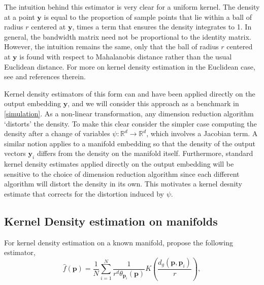 \documentclass[11pt,a4paper,]{article}
\begin{document}
The intuition behind this estimator is very clear for a uniform kernel. The density at a point \(\pmb{y}\) is equal to the proportion of sample points that lie within a ball of radius \(r\) centered at \(\pmb{y}\), times a term that ensures the density integrates to 1. In general, the bandwidth matrix need not be proportional to the identity matrix. However, the intuition remains the same, only that the ball of radius \(r\) centered at \(\pmb{y}\) is found with respect to Mahalanobis distance rather than the usual Euclidean distance. For more on kernel density estimation in the Euclidean case, see \textcite{Scott2015-vl} and references therein.

Kernel density estimators of this form can and have been applied directly on the output embedding \(\pmb{y}\), and we will consider this approach as a benchmark in \autoref{simulation}. As a non-linear transformation, any dimension reduction algorithm `distorts' the density. To make this clear consider the simpler case computing the density after a change of variables \(\psi:\mathbb{R}^d\rightarrow\mathbb{R}^d\), which involves a Jacobian term. A similar notion applies to a manifold embedding so that the density of the output vectors \(\pmb{y}_i\) differs from the density on the manifold itself. Furthermore, standard kernel density estimates applied directly on the output embedding will be sensitive to the choice of dimension reduction algorithm since each different algorithm will distort the density in its own. This motivates a kernel desnity estimate that corrects for the distortion induced by \(\psi\).

\hypertarget{Pellet}{%
\subsection{Kernel Density estimation on manifolds}\label{Pellet}}

For kernel density estimation on a known manifold, \textcite{Pelletier2005-vu} propose the following estimator,
\begin{equation}
\label{eq:denriem}
\hat{f}(\pmb{p}) = \frac{1}{N} \sum_{i=1}^{N} \frac{1}{r^d \theta_{\pmb{p}_i}(\pmb{p})} K\left(\frac{d_g(\pmb{p}, \pmb{p}_i)}{r}\right),
\end{equation}
\end{document}
